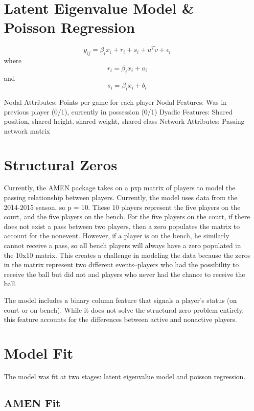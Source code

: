 \documentclass[12pt,twoside]{dukestatscithesis}
\theoremstyle{definition}
\theoremstyle{definition}
\theoremstyle{definition}
\theoremstyle{remark}
\begin{document}
\section{Latent Eigenvalue Model \& Poisson
Regression}\label{latent-eigenvalue-model-poisson-regression}

\[y_{ij} =  \beta_{i}x_{i} + r_{i} + s_{i} + u^{T}v + \epsilon_{i}\]
where \[r_{i} = \beta_{i}x_{i} + a_{i}\] and
\[s_{i} = \beta_{i}x_{i} + b_{i}\]

Nodal Attributes: Points per game for each player Nodal Features: Was in
previous player (0/1), currently in possession (0/1) Dyadic Features:
Shared position, shared height, shared weight, shared class Network
Attributes: Passing network matrix

\section{Structural Zeros}\label{structural-zeros}

Currently, the AMEN package takes on a pxp matrix of players to model
the passing relationship between players. Currently, the model uses data
from the 2014-2015 season, so p = 10. These 10 players represent the
five players on the court, and the five players on the bench. For the
five players on the court, if there does not exist a pass between two
players, then a zero populates the matrix to account for the nonevent.
However, if a player is on the bench, he similarly cannot receive a
pass, so all bench players will always have a zero populated in the
10x10 matrix. This creates a challenge in modeling the data because the
zeros in the matrix represent two different events--players who had the
possibility to receive the ball but did not and players who never had
the chance to receive the ball.

The model includes a binary column feature that signals a player's
status (on court or on bench). While it does not solve the structural
zero problem entirely, this feature accounts for the differences between
active and nonactive players.

\section{Model Fit}\label{model-fit}

The model was fit at two stages: latent eigenvalue model and poisson
regression.

\subsection{AMEN Fit}\label{amen-fit}
\end{document}

